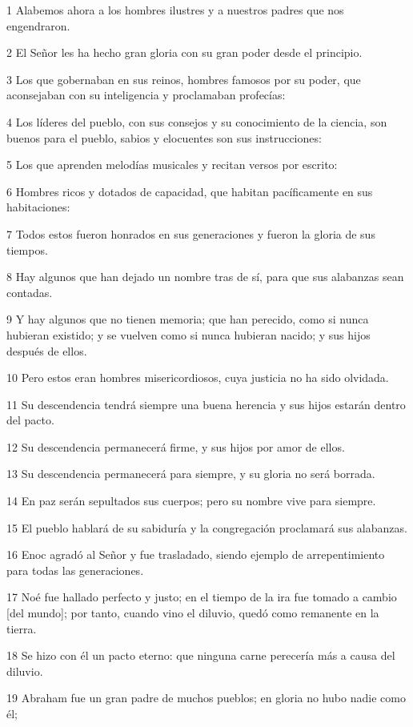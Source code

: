 \par 1 Alabemos ahora a los hombres ilustres y a nuestros padres que nos engendraron.
\par 2 El Señor les ha hecho gran gloria con su gran poder desde el principio.
\par 3 Los que gobernaban en sus reinos, hombres famosos por su poder, que aconsejaban con su inteligencia y proclamaban profecías:
\par 4 Los líderes del pueblo, con sus consejos y su conocimiento de la ciencia, son buenos para el pueblo, sabios y elocuentes son sus instrucciones:
\par 5 Los que aprenden melodías musicales y recitan versos por escrito:
\par 6 Hombres ricos y dotados de capacidad, que habitan pacíficamente en sus habitaciones:
\par 7 Todos estos fueron honrados en sus generaciones y fueron la gloria de sus tiempos.
\par 8 Hay algunos que han dejado un nombre tras de sí, para que sus alabanzas sean contadas.
\par 9 Y hay algunos que no tienen memoria; que han perecido, como si nunca hubieran existido; y se vuelven como si nunca hubieran nacido; y sus hijos después de ellos.
\par 10 Pero estos eran hombres misericordiosos, cuya justicia no ha sido olvidada.
\par 11 Su descendencia tendrá siempre una buena herencia y sus hijos estarán dentro del pacto.
\par 12 Su descendencia permanecerá firme, y sus hijos por amor de ellos.
\par 13 Su descendencia permanecerá para siempre, y su gloria no será borrada.
\par 14 En paz serán sepultados sus cuerpos; pero su nombre vive para siempre.
\par 15 El pueblo hablará de su sabiduría y la congregación proclamará sus alabanzas.
\par 16 Enoc agradó al Señor y fue trasladado, siendo ejemplo de arrepentimiento para todas las generaciones.
\par 17 Noé fue hallado perfecto y justo; en el tiempo de la ira fue tomado a cambio [del mundo]; por tanto, cuando vino el diluvio, quedó como remanente en la tierra.
\par 18 Se hizo con él un pacto eterno: que ninguna carne perecería más a causa del diluvio.
\par 19 Abraham fue un gran padre de muchos pueblos; en gloria no hubo nadie como él;
